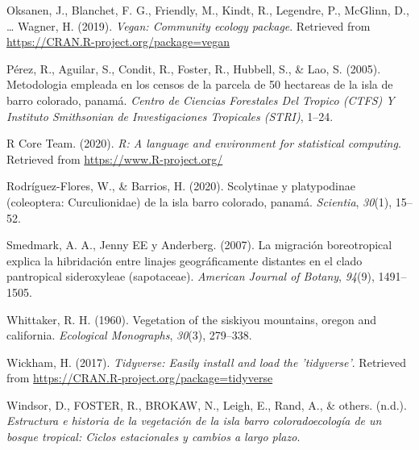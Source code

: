 \documentclass[11pt,]{article}
\begin{document}
\hypertarget{ref-vegan}{}
Oksanen, J., Blanchet, F. G., Friendly, M., Kindt, R., Legendre, P.,
McGlinn, D., \ldots{} Wagner, H. (2019). \emph{Vegan: Community ecology
package}. Retrieved from \url{https://CRAN.R-project.org/package=vegan}

\hypertarget{ref-perez2005metodologia}{}
Pérez, R., Aguilar, S., Condit, R., Foster, R., Hubbell, S., \& Lao, S.
(2005). Metodologia empleada en los censos de la parcela de 50 hectareas
de la isla de barro colorado, panamá. \emph{Centro de Ciencias
Forestales Del Tropico (CTFS) Y Instituto Smithsonian de Investigaciones
Tropicales (STRI)}, 1--24.

\hypertarget{ref-Restudio}{}
R Core Team. (2020). \emph{R: A language and environment for statistical
computing}. Retrieved from \url{https://www.R-project.org/}

\hypertarget{ref-rodriguez2020scolytinae}{}
Rodríguez-Flores, W., \& Barrios, H. (2020). Scolytinae y platypodinae
(coleoptera: Curculionidae) de la isla barro colorado, panamá.
\emph{Scientia}, \emph{30}(1), 15--52.

\hypertarget{ref-smedmark2007boreotropical}{}
Smedmark, A. A., Jenny EE y Anderberg. (2007). La migración
boreotropical explica la hibridación entre linajes geográficamente
distantes en el clado pantropical sideroxyleae (sapotaceae).
\emph{American Journal of Botany}, \emph{94}(9), 1491--1505.

\hypertarget{ref-whittaker1960vegetation}{}
Whittaker, R. H. (1960). Vegetation of the siskiyou mountains, oregon
and california. \emph{Ecological Monographs}, \emph{30}(3), 279--338.

\hypertarget{ref-tidyverse}{}
Wickham, H. (2017). \emph{Tidyverse: Easily install and load the
'tidyverse'}. Retrieved from
\url{https://CRAN.R-project.org/package=tidyverse}

\hypertarget{ref-windsorestructura}{}
Windsor, D., FOSTER, R., BROKAW, N., Leigh, E., Rand, A., \& others.
(n.d.). \emph{Estructura e historia de la vegetación de la isla barro
coloradoecología de un bosque tropical: Ciclos estacionales y cambios a
largo plazo}.




\newpage
\singlespacing 
\end{document}
